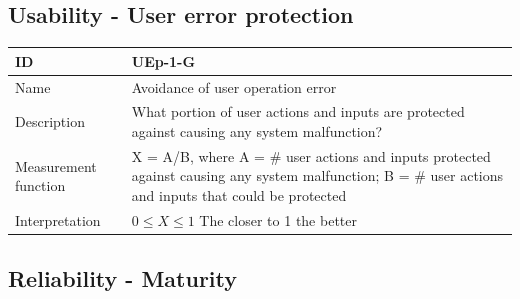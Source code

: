 \subsection{Usability - User error protection}

\begin{table}[h!]
  \renewcommand{\arraystretch}{1.4}
  \centering
  \begin{tabularx}{\textwidth}{l X}
    \toprule
    \textbf{ID}          & \textbf{UEp-1-G}                                                                                                                                       \\
    \midrule
    Name                 & Avoidance of user operation error                                                                                                                      \\
    Description          & What portion of user actions and inputs are protected against causing any system malfunction?                                                          \\
    Measurement function & X = A/B, where A = \# user actions and inputs protected against causing any system malfunction; B = \# user actions and inputs that could be protected \\
    Interpretation       & $0 \leq X \leq 1$ The closer to 1 the better                                                                                                           \\
    \bottomrule
  \end{tabularx}
\end{table}

\subsection{Reliability - Maturity}

